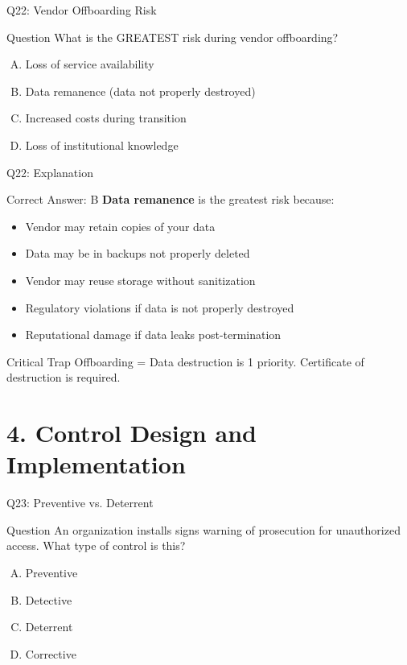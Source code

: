 \documentclass{beamer}
\begin{document}
	\begin{frame}{Q22: Vendor Offboarding Risk}
		\begin{block}{Question}
			What is the GREATEST risk during vendor offboarding?
		\end{block}
		\begin{enumerate}[(A)]
			\item Loss of service availability
			\item Data remanence (data not properly destroyed)
			\item Increased costs during transition
			\item Loss of institutional knowledge
		\end{enumerate}
	\end{frame}
	
	\begin{frame}{Q22: Explanation}
		\begin{block}{Correct Answer: B}
			\textbf{Data remanence} is the greatest risk because:
			\begin{itemize}
				\item Vendor may retain copies of your data
				\item Data may be in backups not properly deleted
				\item Vendor may reuse storage without sanitization
				\item Regulatory violations if data is not properly destroyed
				\item Reputational damage if data leaks post-termination
			\end{itemize}
		\end{block}
		\begin{alertblock}{Critical Trap}
			Offboarding = Data destruction is 1 priority.
			Certificate of destruction is required.
		\end{alertblock}
	\end{frame}
	
	
	\section{4. Control Design and Implementation}
	
	\begin{frame}{Q23: Preventive vs. Deterrent}
		\begin{block}{Question}
			An organization installs signs warning of prosecution for unauthorized access. What type of control is this?
		\end{block}
		\begin{enumerate}[(A)]
			\item Preventive
			\item Detective
			\item Deterrent
			\item Corrective
		\end{enumerate}
	\end{frame}
	
\end{document}
